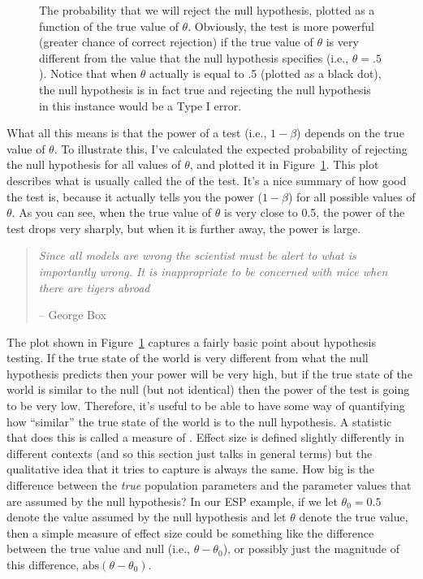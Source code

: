 \begin{figure}[t]
\begin{center}
\caption{The probability that we will reject the null hypothesis, plotted as a function of the true value of $\theta$. Obviously, the test is more powerful (greater chance of correct rejection) if the true value of $\theta$ is very different from the value that the null hypothesis specifies (i.e., $\theta=.5$). Notice that when $\theta$ actually is equal to .5 (plotted as a black dot), the null hypothesis is in fact true and rejecting the null hypothesis in this instance would be a Type I error.}
\label{fig:powerfunction}
\HR
\end{center}
\end{figure}

What all this means is that the power of a test (i.e., $1-\beta$) depends on the true value of $\theta$. To illustrate this, I've calculated the expected probability of rejecting the null hypothesis for all values of $\theta$, and plotted it in Figure~\ref{fig:powerfunction}. This plot describes what is usually called the  of the test. It's a nice summary of how good the test is, because it actually tells you the power ($1-\beta$) for all possible values of $\theta$. As you can see, when the true value of $\theta$ is very close to 0.5, the power of the test drops very sharply, but when it is further away, the power is large. 


\begin{quote}
{\it Since all models are wrong the scientist must be alert to what is importantly wrong. It is inappropriate to be concerned with mice when there are tigers abroad} 

\hspace*{2cm} -- George Box \parencite[p.~792]{Box1976}
\end{quote}

The plot shown in Figure~\ref{fig:powerfunction} captures a fairly basic point about hypothesis testing. If the true state of the world is very different from what the null hypothesis predicts then your power will be very high, but if the true state of the world is similar to the null (but not identical) then the power of the test is going to be very low. Therefore, it's useful to be able to have some way of quantifying how ``similar'' the true state of the world is to the null hypothesis. A statistic that does this is called a measure of  \parencite[e.g.,][]{Cohen1988,Ellis2010}. Effect size is defined slightly differently in different contexts (and so this section just talks in general terms) but the qualitative idea that it tries to capture is always the same. How big is the difference between the {\it true} population parameters and the parameter values that are assumed by the null hypothesis? In our ESP example, if we let $\theta_0 = 0.5$ denote the value assumed by the null hypothesis and let $\theta$ denote the true value, then a simple measure of effect size could be something like the difference between the true value and null (i.e., $\theta - \theta_0$), or possibly just the magnitude of this difference, $\mbox{abs}(\theta - \theta_0)$.

